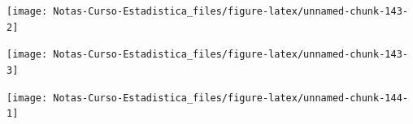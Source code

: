 \documentclass[
  12pt,
]{book}
\newenvironment{Shaded}{\begin{snugshade}}{\end{snugshade}}
\newcommand{\DataTypeTok}[1]{\textcolor[rgb]{0.13,0.29,0.53}{#1}}
\newcommand{\DecValTok}[1]{\textcolor[rgb]{0.00,0.00,0.81}{#1}}
\newcommand{\FloatTok}[1]{\textcolor[rgb]{0.00,0.00,0.81}{#1}}
\newcommand{\KeywordTok}[1]{\textcolor[rgb]{0.13,0.29,0.53}{\textbf{#1}}}
\newcommand{\NormalTok}[1]{#1}
\newcommand{\OperatorTok}[1]{\textcolor[rgb]{0.81,0.36,0.00}{\textbf{#1}}}
\newcommand{\StringTok}[1]{\textcolor[rgb]{0.31,0.60,0.02}{#1}}
\theoremstyle{definition}
\theoremstyle{definition}
\theoremstyle{definition}
\theoremstyle{remark}
\begin{document}
\begin{center}\texttt{[image: Notas-Curso-Estadistica\_files/figure-latex/unnamed-chunk-143-2]} \end{center}

\begin{Shaded}
\end{Shaded}

\begin{center}\texttt{[image: Notas-Curso-Estadistica\_files/figure-latex/unnamed-chunk-143-3]} \end{center}

\begin{Shaded}
\end{Shaded}

\begin{center}\texttt{[image: Notas-Curso-Estadistica\_files/figure-latex/unnamed-chunk-144-1]} \end{center}
\end{document}
